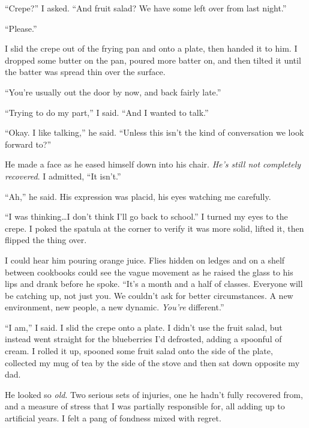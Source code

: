 ``Crepe?'' I asked.  ``And fruit salad?  We have some left over from last night.''



``Please.''



I slid the crepe out of the frying pan and onto a plate, then handed it to him.  I dropped some butter on the pan, poured more batter on, and then tilted it until the batter was spread thin over the surface.



``You're usually out the door by now, and back fairly late.''



``Trying to do my part,'' I said.  ``And I wanted to talk.''



``Okay.  I like talking,'' he said.  ``Unless this isn't the kind of conversation we look forward to?''



He made a face as he eased himself down into his chair.  \emph{ He's still not completely recovered}.  I admitted, ``It isn't.''



``Ah,'' he said.  His expression was placid, his eyes watching me carefully.



``I was thinking\ldots I don't think I'll go back to school.''  I turned my eyes to the crepe.  I poked the spatula at the corner to verify it was more solid, lifted it, then flipped the thing over.



I could hear him pouring orange juice.  Flies hidden on ledges and on a shelf between cookbooks could see the vague movement as he raised the glass to his lips and drank before he spoke.  ``It's a month and a half of classes.  Everyone will be catching up, not just you.  We couldn't ask for better circumstances.  A new environment, new people, a new dynamic.  \emph{You're} different.''



``I am,'' I said.  I slid the crepe onto a plate.  I didn't use the fruit salad, but instead went straight for the blueberries I'd defrosted, adding a spoonful of cream.  I rolled it up, spooned some fruit salad onto the side of the plate, collected my mug of tea by the side of the stove and then sat down opposite my dad.



He looked so \emph{old}.  Two serious sets of injuries, one he hadn't fully recovered from, and a measure of stress that I was partially responsible for, all adding up to artificial years.  I felt a pang of fondness mixed with regret.



